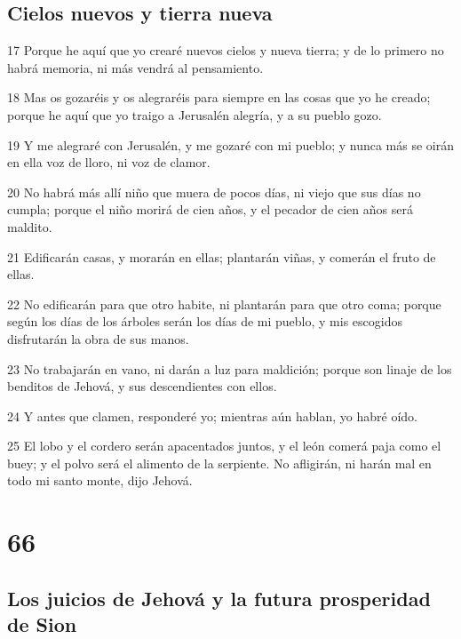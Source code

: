 \section*{Cielos nuevos y tierra nueva}

\par 17 Porque he aquí que yo crearé nuevos cielos y nueva tierra; y de lo primero no habrá memoria, ni más vendrá al pensamiento.
\par 18 Mas os gozaréis y os alegraréis para siempre en las cosas que yo he creado; porque he aquí que yo traigo a Jerusalén alegría, y a su pueblo gozo.
\par 19 Y me alegraré con Jerusalén, y me gozaré con mi pueblo; y nunca más se oirán en ella voz de lloro, ni voz de clamor.
\par 20 No habrá más allí niño que muera de pocos días, ni viejo que sus días no cumpla; porque el niño morirá de cien años, y el pecador de cien años será maldito.
\par 21 Edificarán casas, y morarán en ellas; plantarán viñas, y comerán el fruto de ellas.
\par 22 No edificarán para que otro habite, ni plantarán para que otro coma; porque según los días de los árboles serán los días de mi pueblo, y mis escogidos disfrutarán la obra de sus manos.
\par 23 No trabajarán en vano, ni darán a luz para maldición; porque son linaje de los benditos de Jehová, y sus descendientes con ellos.
\par 24 Y antes que clamen, responderé yo; mientras aún hablan, yo habré oído.
\par 25 El lobo y el cordero serán apacentados juntos, y el león comerá paja como el buey; y el polvo será el alimento de la serpiente. No afligirán, ni harán mal en todo mi santo monte, dijo Jehová. 

\chapter{66}

\section*{Los juicios de Jehová y la futura prosperidad de Sion}

